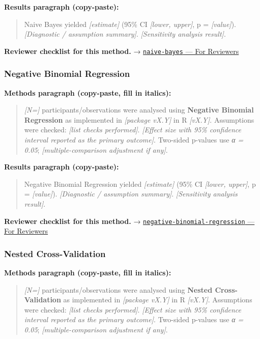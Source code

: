 \documentclass[
]{article}
\begin{document}
\textbf{Results paragraph (copy-paste):}

\begin{quote}
Naive Bayes yielded \emph{{[}estimate{]}} (95\% CI \emph{{[}lower,
upper{]}}, p = \emph{{[}value{]}}). \emph{{[}Diagnostic / assumption
summary{]}}. \emph{{[}Sensitivity analysis result{]}}.
\end{quote}

\textbf{Reviewer checklist for this method.} →
\href{../chapters/13-ml/naive-bayes.Rmd\#for-reviewers}{\texttt{naive-bayes}
--- For Reviewers}

\subsubsection{Negative Binomial
Regression}\label{negative-binomial-regression}

\textbf{Methods paragraph (copy-paste, fill in italics):}

\begin{quote}
\emph{{[}N={]}} participants/observations were analysed using
\textbf{Negative Binomial Regression} as implemented in \emph{{[}package
vX.Y{]}} in R \emph{{[}vX.Y{]}}. Assumptions were checked: \emph{{[}list
checks performed{]}}. \emph{{[}Effect size with 95\% confidence interval
reported as the primary outcome{]}}. Two-sided p-values use \emph{α =
0.05}; \emph{{[}multiple-comparison adjustment if any{]}}.
\end{quote}

\textbf{Results paragraph (copy-paste):}

\begin{quote}
Negative Binomial Regression yielded \emph{{[}estimate{]}} (95\% CI
\emph{{[}lower, upper{]}}, p = \emph{{[}value{]}}). \emph{{[}Diagnostic
/ assumption summary{]}}. \emph{{[}Sensitivity analysis result{]}}.
\end{quote}

\textbf{Reviewer checklist for this method.} →
\href{../chapters/07-regression/negative-binomial-regression.Rmd\#for-reviewers}{\texttt{negative-binomial-regression}
--- For Reviewers}

\subsubsection{Nested Cross-Validation}\label{nested-cross-validation}

\textbf{Methods paragraph (copy-paste, fill in italics):}

\begin{quote}
\emph{{[}N={]}} participants/observations were analysed using
\textbf{Nested Cross-Validation} as implemented in \emph{{[}package
vX.Y{]}} in R \emph{{[}vX.Y{]}}. Assumptions were checked: \emph{{[}list
checks performed{]}}. \emph{{[}Effect size with 95\% confidence interval
reported as the primary outcome{]}}. Two-sided p-values use \emph{α =
0.05}; \emph{{[}multiple-comparison adjustment if any{]}}.
\end{quote}
\end{document}
